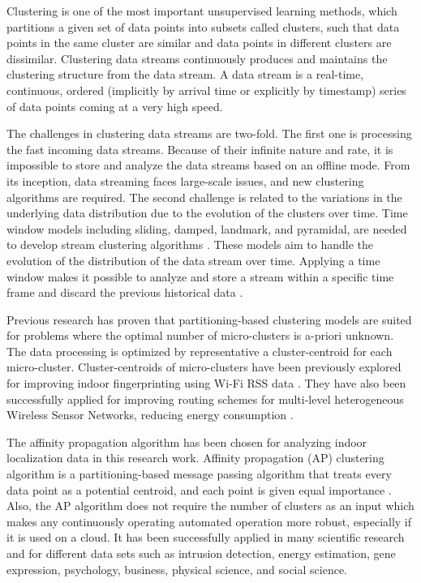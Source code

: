 Clustering is one of the most important unsupervised learning methods, which partitions a given set of data points into subsets called clusters, such that data points in the same cluster are similar and data points in different clusters are dissimilar. Clustering data streams continuously produces and maintains the clustering structure from the data stream. A data stream is a real-time, continuous, ordered (implicitly by arrival time or explicitly by timestamp) series of data points coming at a very high speed.

The challenges in clustering data streams are two-fold. The first one is processing the fast incoming data streams. Because of their infinite nature and rate, it is impossible to store and analyze the data streams based on an offline mode. From its inception, data streaming faces large-scale issues, and new clustering algorithms are required.
The second challenge is related to the variations in the underlying data distribution due to the evolution of the clusters over time. Time window models including sliding, damped, landmark, and pyramidal, are needed to develop stream clustering algorithms  \cite{nguyen2015survey}. These models aim to handle the evolution of the distribution of the data stream over time. Applying a time window makes it possible to analyze and store a stream within a specific time frame and discard the previous historical data \cite{mansalis2018evaluation}.


Previous research has proven that partitioning-based clustering models are suited for problems where the optimal number of micro-clusters is a-priori unknown. The data processing is optimized by representative a cluster-centroid for each micro-cluster. Cluster-centroids of micro-clusters have been previously explored for improving indoor fingerprinting using Wi-Fi RSS data \cite{hu2015improving, subedi2019improving}. They have also been successfully applied for improving routing schemes for multi-level heterogeneous Wireless Sensor Networks, reducing energy consumption \cite{wang2019affinity}. 

The affinity propagation algorithm has been chosen for analyzing indoor localization data in this research work. Affinity propagation (AP) clustering algorithm is a partitioning-based message passing algorithm that treats every data point as a potential centroid, and each point is given equal importance \cite{dueck2009affinity}. Also, the AP algorithm does not require the number of clusters as an input which makes any continuously operating automated operation more robust, especially if it is used on a cloud. It has been successfully applied in many scientific research and for different data sets such as intrusion detection, energy estimation, gene expression, psychology, business, physical science, and social science.


